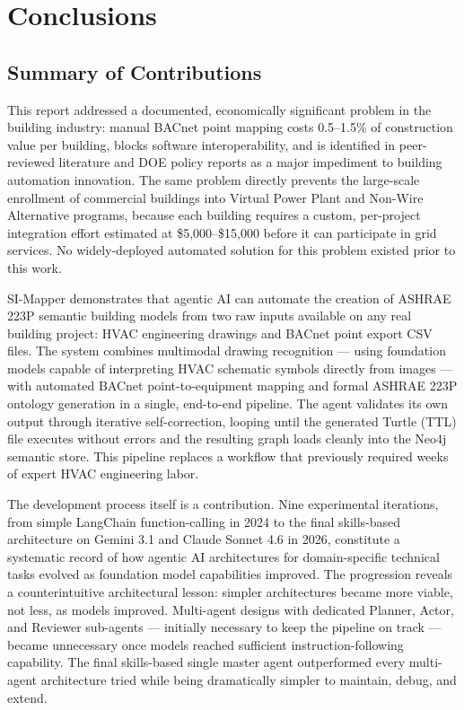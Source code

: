 \section{Conclusions}
\label{sec:conclusions}

\subsection{Summary of Contributions}
\label{subsec:contributions}

This report addressed a documented, economically significant problem in the building industry:
manual BACnet point mapping costs 0.5--1.5\% of construction value per building, blocks software
interoperability, and is identified in peer-reviewed literature and DOE policy reports as a major
impediment to building automation innovation.
The same problem directly prevents the large-scale enrollment of commercial buildings into Virtual
Power Plant and Non-Wire Alternative programs, because each building requires a custom, per-project
integration effort estimated at \$5,000--\$15,000 before it can participate in grid services.
No widely-deployed automated solution for this problem existed prior to this work.

SI-Mapper demonstrates that agentic AI can automate the creation of ASHRAE 223P semantic building
models from two raw inputs available on any real building project: HVAC engineering drawings and
BACnet point export CSV files.
The system combines multimodal drawing recognition --- using foundation models capable of interpreting
HVAC schematic symbols directly from images --- with automated BACnet point-to-equipment mapping and
formal ASHRAE 223P ontology generation in a single, end-to-end pipeline.
The agent validates its own output through iterative self-correction, looping until the generated
Turtle (TTL) file executes without errors and the resulting graph loads cleanly into the Neo4j
semantic store.
This pipeline replaces a workflow that previously required weeks of expert HVAC engineering labor.

The development process itself is a contribution.
Nine experimental iterations, from simple LangChain function-calling in 2024 to the final
skills-based architecture on Gemini 3.1 and Claude Sonnet 4.6 in 2026, constitute a systematic
record of how agentic AI architectures for domain-specific technical tasks evolved as foundation
model capabilities improved.
The progression reveals a counterintuitive architectural lesson: simpler architectures became
more viable, not less, as models improved.
Multi-agent designs with dedicated Planner, Actor, and Reviewer sub-agents --- initially necessary
to keep the pipeline on track --- became unnecessary once models reached sufficient instruction-following
capability.
The final skills-based single master agent outperformed every multi-agent architecture tried
while being dramatically simpler to maintain, debug, and extend.

